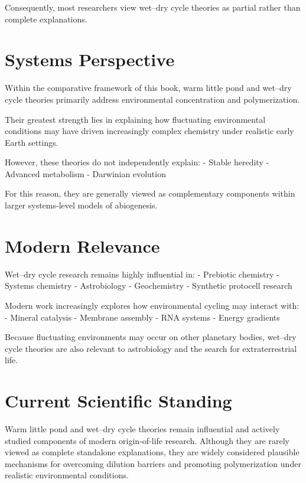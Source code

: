 \documentclass[
  oneside]{book}
\begin{document}
Consequently, most researchers view wet--dry cycle theories as partial rather than complete explanations.

\section{Systems Perspective}\label{systems-perspective-4}

Within the comparative framework of this book, warm little pond and wet--dry cycle theories primarily address environmental concentration and polymerization.

Their greatest strength lies in explaining how fluctuating environmental conditions may have driven increasingly complex chemistry under realistic early Earth settings.

However, these theories do not independently explain:
- Stable heredity
- Advanced metabolism
- Darwinian evolution

For this reason, they are generally viewed as complementary components within larger systems-level models of abiogenesis.

\section{Modern Relevance}\label{modern-relevance-4}

Wet--dry cycle research remains highly influential in:
- Prebiotic chemistry
- Systems chemistry
- Astrobiology
- Geochemistry
- Synthetic protocell research

Modern work increasingly explores how environmental cycling may interact with:
- Mineral catalysis
- Membrane assembly
- RNA systems
- Energy gradients

Because fluctuating environments may occur on other planetary bodies, wet--dry cycle theories are also relevant to astrobiology and the search for extraterrestrial life.

\section{Current Scientific Standing}\label{current-scientific-standing-4}

Warm little pond and wet--dry cycle theories remain influential and actively studied components of modern origin-of-life research. Although they are rarely viewed as complete standalone explanations, they are widely considered plausible mechanisms for overcoming dilution barriers and promoting polymerization under realistic environmental conditions.
\end{document}
